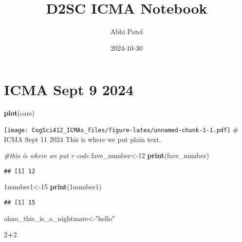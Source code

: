 \documentclass[
]{article}
\title{D2SC ICMA Notebook}
\author{Abhi Patel}
\date{2024-10-30}
\newenvironment{Shaded}{\begin{snugshade}}{\end{snugshade}}
\newcommand{\AttributeTok}[1]{\textcolor[rgb]{0.13,0.29,0.53}{#1}}
\newcommand{\CommentTok}[1]{\textcolor[rgb]{0.56,0.35,0.01}{\textit{#1}}}
\newcommand{\DecValTok}[1]{\textcolor[rgb]{0.00,0.00,0.81}{#1}}
\newcommand{\FunctionTok}[1]{\textcolor[rgb]{0.13,0.29,0.53}{\textbf{#1}}}
\newcommand{\NormalTok}[1]{#1}
\newcommand{\OtherTok}[1]{\textcolor[rgb]{0.56,0.35,0.01}{#1}}
\newcommand{\SpecialCharTok}[1]{\textcolor[rgb]{0.81,0.36,0.00}{\textbf{#1}}}
\newcommand{\StringTok}[1]{\textcolor[rgb]{0.31,0.60,0.02}{#1}}
\begin{document}
\maketitle

\section{ICMA Sept 9 2024}\label{icma-sept-9-2024}

\begin{Shaded}
\begin{Highlighting}[]
\FunctionTok{plot}\NormalTok{(cars)}
\end{Highlighting}
\end{Shaded}

\texttt{[image: CogSci412\_ICMAs\_files/figure-latex/unnamed-chunk-1-1.pdf]}
\# ICMA Sept 11 2024 This is where we put plain text.

\begin{Shaded}
\begin{Highlighting}[]
\CommentTok{\#this is where we put r code}
\NormalTok{fave\_number}\OtherTok{\textless{}{-}}\DecValTok{12}
\FunctionTok{print}\NormalTok{(fave\_number)}
\end{Highlighting}
\end{Shaded}

\begin{verbatim}
## [1] 12
\end{verbatim}

\begin{Shaded}
\begin{Highlighting}[]
\StringTok{\textasciigrave{}}\AttributeTok{1number1}\StringTok{\textasciigrave{}}\OtherTok{\textless{}{-}}\DecValTok{15}
\FunctionTok{print}\NormalTok{(}\StringTok{\textasciigrave{}}\AttributeTok{1number1}\StringTok{\textasciigrave{}}\NormalTok{)}
\end{Highlighting}
\end{Shaded}

\begin{verbatim}
## [1] 15
\end{verbatim}

\begin{Shaded}
\begin{Highlighting}[]
\NormalTok{ohno\_this\_is\_a\_nightmare}\OtherTok{\textless{}{-}}\StringTok{"hello"}
\end{Highlighting}
\end{Shaded}

\begin{Shaded}
\begin{Highlighting}[]
\DecValTok{2}\SpecialCharTok{+}\DecValTok{2}
\end{Highlighting}
\end{Shaded}
\end{document}
